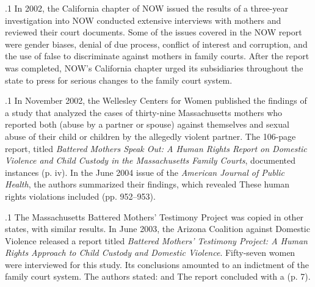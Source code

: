 \documentclass[11pt, twoside]{article}
\begin{document}
{\p.1{%
In 2002, the California chapter of NOW issued the results of a
three-year investigation into  NOW conducted extensive interviews
with mothers and reviewed their court documents. Some of the issues
covered in the NOW report were gender biases, denial of due process,
conflict of interest and corruption, and the use of false  to
discriminate against mothers in family courts. After the report was
completed, NOW’s California chapter urged its subsidiaries throughout
the state to press for serious changes to the family court system.
}%

\p.1{%
In November 2002, the Wellesley Centers for Women published the
findings of a study that analyzed the cases of thirty-nine Massachusetts
mothers who reported both  (abuse by a partner or spouse) against themselves and sexual abuse of their child or
children by the allegedly violent partner. The 106-page report, titled \textit{Battered Mothers Speak Out: A Human Rights Report on Domestic Violence
and Child Custody in the Massachusetts Family Courts}, documented
instances  (p. iv). In the June 2004 issue of
the \textit{American Journal of Public Health}, the authors summarized
their findings, which revealed  These human
rights violations included  (pp. 952–953).
}%

\p.1{%
The Massachusetts Battered Mothers’ Testimony Project was copied
in other states, with similar results. In June 2003, the Arizona Coalition against Domestic Violence released a report titled \textit{Battered Mothers’
Testimony Project: A Human Rights Approach to Child
Custody and Domestic Violence}. Fifty-seven women were interviewed for this study. Its
conclusions amounted to an indictment of the family court system.
The authors stated:  and
 The report concluded with a  (p. 7).
}%

}
\end{document}
